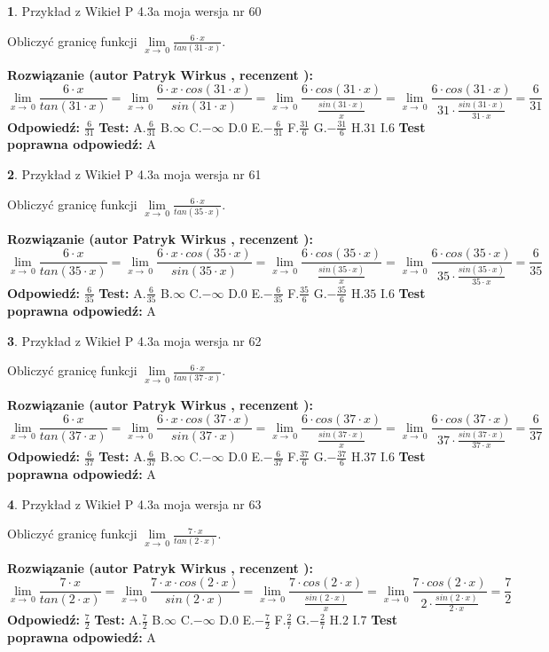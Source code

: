\documentclass[12pt, a4paper]{article}
\theoremstyle{definition} %
\newtheorem{zad}{}
\newcommand{\zadStart}[1]{\begin{zad}#1\newline}
\newcommand{\zadStop}{\end{zad}}
\newcommand{\rozwStart}[2]{\noindent \textbf{Rozwiązanie (autor #1 , recenzent #2): }\newline}
\newcommand{\rozwStop}{\newline}
\newcommand{\odpStart}{\noindent \textbf{Odpowiedź:}\newline}
\newcommand{\odpStop}{\newline}
\newcommand{\testStart}{\noindent \textbf{Test:}\newline}
\newcommand{\testStop}{\newline}
\newcommand{\kluczStart}{\noindent \textbf{Test poprawna odpowiedź:}\newline}
\newcommand{\kluczStop}{\newline}
\begin{document}
\zadStart{Przykład z Wikieł P 4.3a moja wersja nr 60}


Obliczyć granicę funkcji $\lim\limits_{x\to\ 0}\frac{6 \cdot x}{tan(31 \cdot x)}$.
\zadStop
\rozwStart{Patryk Wirkus}{}
$$\lim\limits_{x\to\ 0}\frac{6 \cdot x}{tan(31 \cdot x)}=\lim\limits_{x\to\ 0}\frac{6 \cdot x \cdot cos(31 \cdot x)}{sin(31 \cdot x)}=\lim\limits_{x\to\ 0}\frac{6 \cdot cos(31 \cdot x)}{\frac{sin(31 \cdot x)}{x}}=\lim\limits_{x\to\ 0}\frac{6 \cdot cos(31 \cdot x)}{31 \cdot \frac{sin(31 \cdot x)}{31 \cdot x}} = \frac{6}{31}$$
\rozwStop
\odpStart
$\frac{6}{31}$
\odpStop
\testStart
A.$\frac{6}{31}$
B.$\infty$
C.$-\infty$
D.$0$
E.$-\frac{6}{31}$
F.$\frac{31}{6}$
G.$-\frac{31}{6}$
H.$31$
I.$6$
\testStop
\kluczStart
A
\kluczStop



\zadStart{Przykład z Wikieł P 4.3a moja wersja nr 61}


Obliczyć granicę funkcji $\lim\limits_{x\to\ 0}\frac{6 \cdot x}{tan(35 \cdot x)}$.
\zadStop
\rozwStart{Patryk Wirkus}{}
$$\lim\limits_{x\to\ 0}\frac{6 \cdot x}{tan(35 \cdot x)}=\lim\limits_{x\to\ 0}\frac{6 \cdot x \cdot cos(35 \cdot x)}{sin(35 \cdot x)}=\lim\limits_{x\to\ 0}\frac{6 \cdot cos(35 \cdot x)}{\frac{sin(35 \cdot x)}{x}}=\lim\limits_{x\to\ 0}\frac{6 \cdot cos(35 \cdot x)}{35 \cdot \frac{sin(35 \cdot x)}{35 \cdot x}} = \frac{6}{35}$$
\rozwStop
\odpStart
$\frac{6}{35}$
\odpStop
\testStart
A.$\frac{6}{35}$
B.$\infty$
C.$-\infty$
D.$0$
E.$-\frac{6}{35}$
F.$\frac{35}{6}$
G.$-\frac{35}{6}$
H.$35$
I.$6$
\testStop
\kluczStart
A
\kluczStop



\zadStart{Przykład z Wikieł P 4.3a moja wersja nr 62}


Obliczyć granicę funkcji $\lim\limits_{x\to\ 0}\frac{6 \cdot x}{tan(37 \cdot x)}$.
\zadStop
\rozwStart{Patryk Wirkus}{}
$$\lim\limits_{x\to\ 0}\frac{6 \cdot x}{tan(37 \cdot x)}=\lim\limits_{x\to\ 0}\frac{6 \cdot x \cdot cos(37 \cdot x)}{sin(37 \cdot x)}=\lim\limits_{x\to\ 0}\frac{6 \cdot cos(37 \cdot x)}{\frac{sin(37 \cdot x)}{x}}=\lim\limits_{x\to\ 0}\frac{6 \cdot cos(37 \cdot x)}{37 \cdot \frac{sin(37 \cdot x)}{37 \cdot x}} = \frac{6}{37}$$
\rozwStop
\odpStart
$\frac{6}{37}$
\odpStop
\testStart
A.$\frac{6}{37}$
B.$\infty$
C.$-\infty$
D.$0$
E.$-\frac{6}{37}$
F.$\frac{37}{6}$
G.$-\frac{37}{6}$
H.$37$
I.$6$
\testStop
\kluczStart
A
\kluczStop



\zadStart{Przykład z Wikieł P 4.3a moja wersja nr 63}


Obliczyć granicę funkcji $\lim\limits_{x\to\ 0}\frac{7 \cdot x}{tan(2 \cdot x)}$.
\zadStop
\rozwStart{Patryk Wirkus}{}
$$\lim\limits_{x\to\ 0}\frac{7 \cdot x}{tan(2 \cdot x)}=\lim\limits_{x\to\ 0}\frac{7 \cdot x \cdot cos(2 \cdot x)}{sin(2 \cdot x)}=\lim\limits_{x\to\ 0}\frac{7 \cdot cos(2 \cdot x)}{\frac{sin(2 \cdot x)}{x}}=\lim\limits_{x\to\ 0}\frac{7 \cdot cos(2 \cdot x)}{2 \cdot \frac{sin(2 \cdot x)}{2 \cdot x}} = \frac{7}{2}$$
\rozwStop
\odpStart
$\frac{7}{2}$
\odpStop
\testStart
A.$\frac{7}{2}$
B.$\infty$
C.$-\infty$
D.$0$
E.$-\frac{7}{2}$
F.$\frac{2}{7}$
G.$-\frac{2}{7}$
H.$2$
I.$7$
\testStop
\kluczStart
A
\kluczStop
\end{document}
